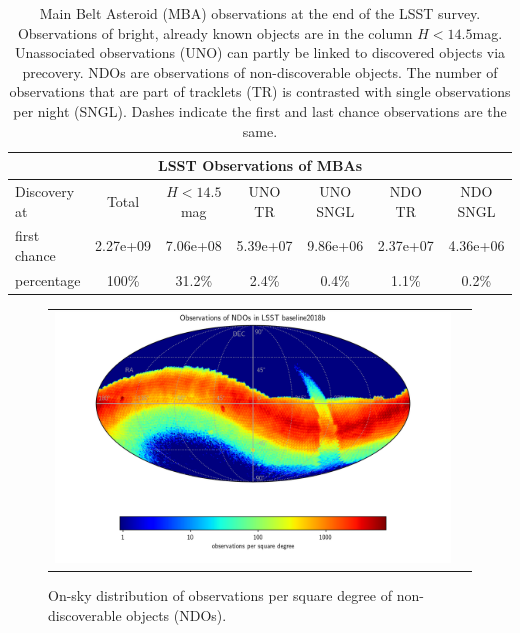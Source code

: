 \begin{table}[tb!]
\begin{center}
\begin{tabular}{lcccccc}
\multicolumn{7}{c}{LSST Observations of MBAs}\\
\hline
Discovery at & Total & $H<14.5$mag & \gls{UNO} TR & \gls{UNO} SNGL & \gls{NDO} TR & \gls{NDO} SNGL \\
\hline
first chance & 2.27e+09 & 7.06e+08 & 5.39e+07 & 9.86e+06 & 2.37e+07 & 4.36e+06 \\
percentage   & 100\%  & 31.2\% & 2.4\% & 0.4\% & 1.1\% & 0.2\% \\\hline
\hline
\end{tabular}
\end{center}
\caption{Main Belt Asteroid (MBA) observations at the end of the \gls{LSST} survey. Observations of bright, already known objects are in the column $H<14.5$mag.
Unassociated observations (\gls{UNO}) can partly be linked to discovered objects via \gls{precovery}. NDOs are observations of non-discoverable objects. The number of observations that are part of tracklets (TR) is contrasted with single observations per night (SNGL). Dashes indicate the first and last chance observations are the same.\label{tab:mbaobs}}
\end{table}

\begin{figure}[tb!]
\begin{center}
\begin{tabular}{cc}
\includegraphics[width=0.80\linewidth]{figs/mba_obs_hp_ndo.png} &
\end{tabular}
\end{center}
\caption{On-sky distribution of observations per square degree of non-discoverable objects (NDOs).  }
\label{fig:ndo_obs_sky}       %
\end{figure}



